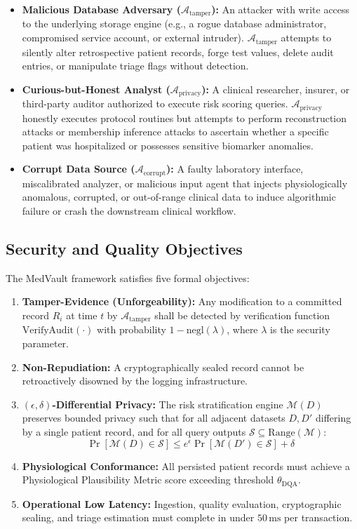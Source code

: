 \documentclass[conference]{IEEEtran}
\begin{document}
\begin{itemize}
    \item \textbf{Malicious Database Adversary ($\mathcal{A}_{\text{tamper}}$):} An attacker with write access to the underlying storage engine (e.g., a rogue database administrator, compromised service account, or external intruder). $\mathcal{A}_{\text{tamper}}$ attempts to silently alter retrospective patient records, forge test values, delete audit entries, or manipulate triage flags without detection.
    \item \textbf{Curious-but-Honest Analyst ($\mathcal{A}_{\text{privacy}}$):} A clinical researcher, insurer, or third-party auditor authorized to execute risk scoring queries. $\mathcal{A}_{\text{privacy}}$ honestly executes protocol routines but attempts to perform reconstruction attacks or membership inference attacks \cite{shokri2017membership} to ascertain whether a specific patient was hospitalized or possesses sensitive biomarker anomalies.
    \item \textbf{Corrupt Data Source ($\mathcal{A}_{\text{corrupt}}$):} A faulty laboratory interface, miscalibrated analyzer, or malicious input agent that injects physiologically anomalous, corrupted, or out-of-range clinical data to induce algorithmic failure or crash the downstream clinical workflow.
\end{itemize}

\subsection{Security and Quality Objectives}
The MedVault framework satisfies five formal objectives:
\begin{enumerate}
    \item \textbf{Tamper-Evidence (Unforgeability):} Any modification to a committed record $R_i$ at time $t$ by $\mathcal{A}_{\text{tamper}}$ shall be detected by verification function $\text{VerifyAudit}(\cdot)$ with probability $1 - \text{negl}(\lambda)$, where $\lambda$ is the security parameter.
    \item \textbf{Non-Repudiation:} A cryptographically sealed record cannot be retroactively disowned by the logging infrastructure.
    \item \textbf{$(\epsilon, \delta)$-Differential Privacy:} The risk stratification engine $\mathcal{M}(D)$ preserves bounded privacy such that for all adjacent datasets $D, D'$ differing by a single patient record, and for all query outputs $\mathcal{S} \subseteq \text{Range}(\mathcal{M})$:
    \begin{equation}
        \Pr[\mathcal{M}(D) \in \mathcal{S}] \le e^{\epsilon} \Pr[\mathcal{M}(D') \in \mathcal{S}] + \delta
        \label{eq:dp_def}
    \end{equation}
    \item \textbf{Physiological Conformance:} All persisted patient records must achieve a Physiological Plausibility Metric score exceeding threshold $\theta_{\text{DQA}}$.
    \item \textbf{Operational Low Latency:} Ingestion, quality evaluation, cryptographic sealing, and triage estimation must complete in under $50\,\text{ms}$ per transaction.
\end{enumerate}
\end{document}
